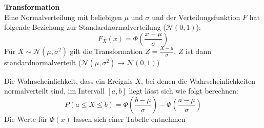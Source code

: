 \textbf{Transformation}\\
Eine Normalverteilung mit beliebigen $\mu$ und $\sigma$ und der Verteilungsfunktion $F$ hat folgende Beziehung zur Standardnormalverteilung ($\mathcal{N}(0,1)$):
\begin{equation*}
	F_X(x) = \Phi \left(\frac{x-\mu}{\sigma} \right)
\end{equation*}
Für $X \sim \mathcal{N}(\mu, \sigma^2)$ gilt die Transformation $Z = \frac{X - \mu}{\sigma}$.
$Z$ ist dann standardnormalverteilt ($\mathcal{N}(\mu, \sigma^2) \rightarrow \mathcal{N}(0, 1)$)

Die Wahrscheinlichkeit, dass ein Ereignis $X$, bei denen die Wahrscheinlichkeiten normalverteilt sind, im Intervall $[a, b]$ liegt lässt sich wie folgt berechnen:
\begin{equation*}
	P(a \leq X \leq b) = \Phi\left(\frac{b - \mu}{\sigma}\right) - \Phi\left(\frac{a - \mu}{\sigma}\right)
\end{equation*}
Die Werte für $\Phi(x)$ lassen sich einer Tabelle entnehmen
